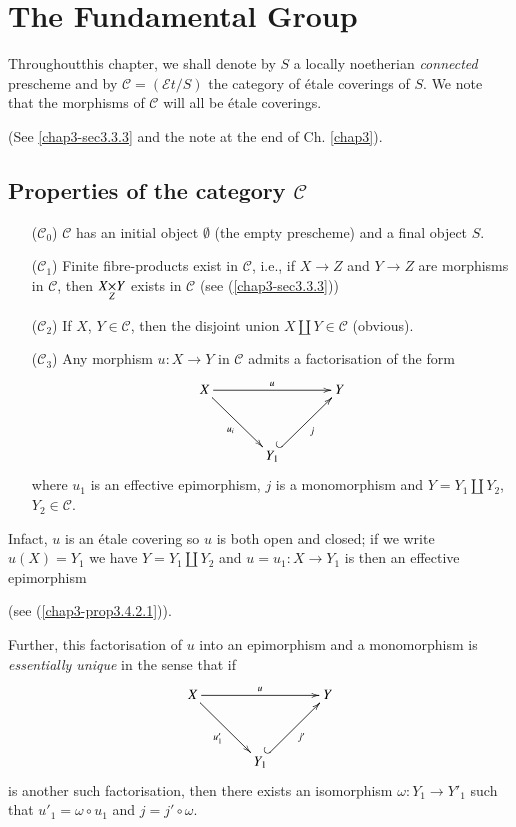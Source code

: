 \chapter{The Fundamental Group}\label{chap4}

Throughout\pageoriginale this chapter, we shall denote by $S$ a
locally noetherian {\em connected} prescheme and by
$\mathscr{C}=(\mathscr{E}t/S)$ the category of \'etale coverings of
$S$. We note that the morphisms of $\mathscr{C}$ will all be \'etale
coverings. 

(See \ref{chap3-sec3.3.3} and the note at the end of Ch. \ref{chap3}).


\section{Properties of the category
  {$\mathscr{C}$}}\label{chap4-sec4.1} 

\begin{itemize}
\item[($\mathscr{C}_{0}$)] $\mathscr{C}$ has an initial object
  $\emptyset$ (the empty prescheme) and a final object $S$.

\item[($\mathscr{C}_{1}$)] Finite fibre-products exist in
  $\mathscr{C}$, i.e., if $X\to Z$ and $Y\to Z$ are morphisms in
  $\mathscr{C}$, then $\fprod{X}{Y}{Z}$ exists in $\mathscr{C}$ (see
  (\ref{chap3-sec3.3.3})) 

\item[($\mathscr{C}_{2}$)] If $X$, $Y\in\mathscr{C}$, then the
  disjoint union $X\coprod Y\in\mathscr{C}$ (obvious).

\item[($\mathscr{C}_{3}$)] Any morphism $u:X\to Y$ in $\mathscr{C}$
  admits a factorisation of the form
\[
\xymatrix@=1.2cm{
X\ar[rr]^{u}\ar[dr]_{u_{i}} & & Y\\
 & Y_{1}\ar@{^{(}->}[ur]_{j}
}
\]
where $u_{1}$ is an effective epimorphism, $j$ is a monomorphism and
$Y=Y_{1}\coprod Y_{2}$, $Y_{2}\in\mathscr{C}$.
\end{itemize}

In\pageoriginale fact, $u$ is an \'etale covering so $u$ is both open
and closed; if we write $u(X)=Y_{1}$ we have $Y=Y_{1}\coprod Y_{2}$
and $u=u_{1}:X\to Y_{1}$ is then an effective epimorphism

(see (\ref{chap3-prop3.4.2.1})).

Further, this factorisation of $u$ into an epimorphism and a
monomorphism is {\em essentially unique} in the sense that if
\[
\xymatrix@=1.2cm{
X\ar[rr]^{u}\ar[dr]_{u'_{1}} & & Y\\
 & Y_{1}\ar@{^{(}->}[ur]_{j'}
}
\]
is another such factorisation, then there exists an isomorphism
$\omega:Y_{1}\to Y'_{1}$ such that $u'_{1}=\omega\circ u_{1}$ and
$j=j'\circ \omega$.

